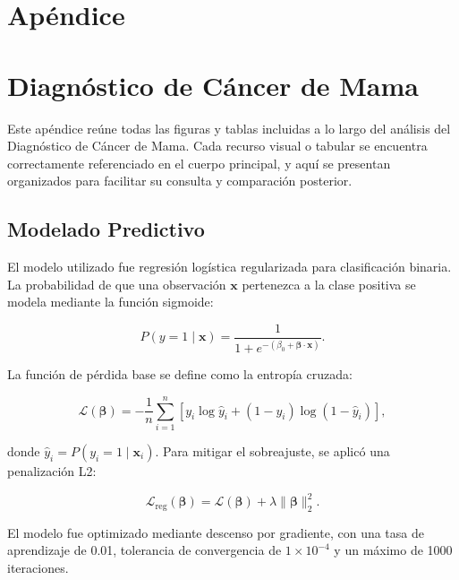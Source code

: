 


\newpage
\appendix
\section*{Apéndice}

\section{Diagnóstico de Cáncer de Mama }
Este apéndice reúne todas las figuras y tablas incluidas a lo largo del análisis del Diagnóstico de Cáncer de Mama. Cada recurso visual o tabular se encuentra correctamente referenciado en el cuerpo principal, y aquí se presentan organizados para facilitar su consulta y comparación posterior.


\subsection{Modelado Predictivo}\label{subsec:modelado-predictivo}


El modelo utilizado fue regresión logística regularizada para clasificación binaria. La probabilidad de que una observación \(\mathbf{x}\) pertenezca a la clase positiva se modela mediante la función sigmoide:

\begin{equation}
P(y = 1 \mid \mathbf{x}) = \frac{1}{1 + e^{-(\beta_0 + \boldsymbol{\beta} \cdot \mathbf{x})}}.
\end{equation}

La función de pérdida base se define como la entropía cruzada:

\begin{equation}
\mathcal{L}(\boldsymbol{\beta}) = -\frac{1}{n} \sum_{i=1}^{n} \left[ y_i \log \hat{y}_i + (1 - y_i) \log(1 - \hat{y}_i) \right],
\end{equation}

donde \(\hat{y}_i = P(y_i = 1 \mid \mathbf{x}_i)\). Para mitigar el sobreajuste, se aplicó una penalización L2:

\begin{equation}
\mathcal{L}_{\text{reg}}(\boldsymbol{\beta}) = \mathcal{L}(\boldsymbol{\beta}) + \lambda \|\boldsymbol{\beta}\|_2^2.
\end{equation}

El modelo fue optimizado mediante descenso por gradiente, con una tasa de aprendizaje de 0.01, tolerancia de convergencia de \(1 \times 10^{-4}\) y un máximo de 1000 iteraciones.


